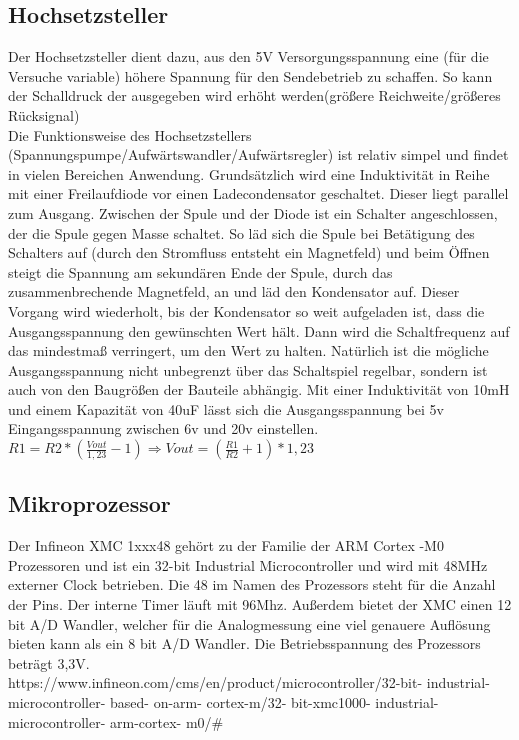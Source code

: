 \subsection{Hochsetzsteller}
Der Hochsetzsteller dient dazu, aus den 5V Versorgungsspannung eine (für die Versuche variable) höhere Spannung für den Sendebetrieb zu schaffen. So kann der Schalldruck der ausgegeben wird erhöht werden(größere Reichweite/größeres Rücksignal)\\
Die Funktionsweise des Hochsetzstellers (Spannungspumpe/Aufwärtswandler/Aufwärtsregler) ist relativ simpel und findet in vielen Bereichen Anwendung. Grundsätzlich wird eine Induktivität in Reihe mit einer Freilaufdiode vor einen Ladecondensator geschaltet. Dieser liegt parallel zum Ausgang. Zwischen der Spule und der Diode ist ein Schalter angeschlossen, der die Spule gegen Masse schaltet. So läd sich die Spule bei Betätigung des Schalters auf (durch den Stromfluss entsteht ein Magnetfeld) und beim Öffnen steigt die Spannung am sekundären Ende der Spule, durch das zusammenbrechende Magnetfeld, an und läd den Kondensator auf. Dieser Vorgang wird wiederholt, bis der Kondensator so weit aufgeladen ist, dass die Ausgangsspannung den gewünschten Wert hält. Dann wird die Schaltfrequenz auf das mindestmaß verringert, um den Wert zu halten. Natürlich ist die mögliche Ausgangsspannung nicht unbegrenzt über das Schaltspiel regelbar, sondern ist auch von den Baugrößen der Bauteile abhängig. Mit einer Induktivität von 10mH und einem Kapazität von 40uF lässt sich die Ausgangsspannung bei 5v Eingangsspannung zwischen 6v und 20v einstellen.
\onehalfspacing \\
\(\displaystyle R1=R2*\left(\frac{Vout}{1,23}-1\right)\Rightarrow Vout=\left(\frac{R1}{R2}+1\right)*1,23\) 
\singlespacing

\subsection{Mikroprozessor}
Der Infineon XMC 1xxx48 gehört zu der Familie der ARM Cortex -M0 Prozessoren und ist ein 32-bit Industrial Microcontroller und wird mit 48MHz externer Clock betrieben. Die 48 im Namen des Prozessors steht für die Anzahl der Pins. Der interne Timer läuft mit 96Mhz. Außerdem bietet der XMC einen 12 bit A/D Wandler, welcher für die Analogmessung eine viel genauere Auflösung bieten kann als ein 8 bit A/D Wandler. Die Betriebsspannung des Prozessors beträgt 3,3V.\\
https://www.infineon.com/cms/en/product/microcontroller/32-bit- industrial-microcontroller- based-
on-arm- cortex-m/32- bit-xmc1000- industrial-microcontroller- arm-cortex- m0/\#\\


